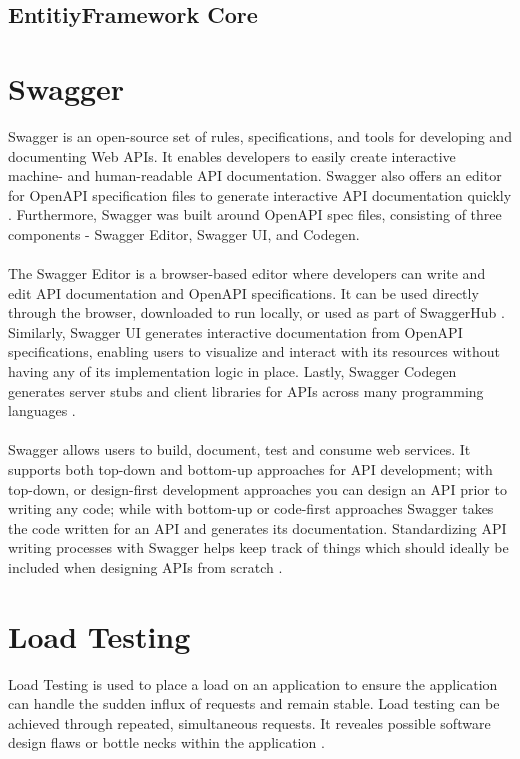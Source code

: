 \documentclass[BIF,Bachelor,nenglish]{twbook}%
\begin{document}
\subsection{EntitiyFramework Core}

\section{Swagger}
Swagger is an open-source set of rules, specifications, and tools for developing and documenting Web \ac{API}s. It enables developers to easily create interactive machine- and human-readable \ac{API} documentation. Swagger also offers an editor for OpenAPI specification files to generate interactive \ac{API} documentation quickly \cite{javapoint}. Furthermore, Swagger was built around OpenAPI spec files, consisting of three components - Swagger Editor, Swagger UI, and Codegen.
\\
\\
The Swagger Editor is a browser-based editor where developers can write and edit \ac{API} documentation and OpenAPI specifications. It can be used directly through the browser, downloaded to run locally, or used as part of SwaggerHub \cite{hubspot}. Similarly, Swagger UI generates interactive documentation from OpenAPI specifications, enabling users to visualize and interact with its resources without having any of its implementation logic in place. Lastly, Swagger Codegen generates server stubs and client libraries for \ac{API}s across many programming languages \cite{swagger}.
\\
\\
Swagger allows users to build, document, test and consume web services. It supports both top-down and bottom-up approaches for \ac{API} development; with top-down, or design-first development approaches you can design an \ac{API} prior to writing any code; while with bottom-up or code-first approaches Swagger takes the code written for an \ac{API} and generates its documentation. Standardizing \ac{API} writing processes with Swagger helps keep track of things which should ideally be included when designing \ac{API}s from scratch \cite{scaleyourapp}.

\section{Load Testing}
Load Testing is used to place a load on an application to ensure the application can handle the sudden influx of requests and remain stable. Load testing can be achieved through repeated, simultaneous requests. It reveales possible software design flaws or bottle necks within the application \cite{loadtest}.
\end{document}
